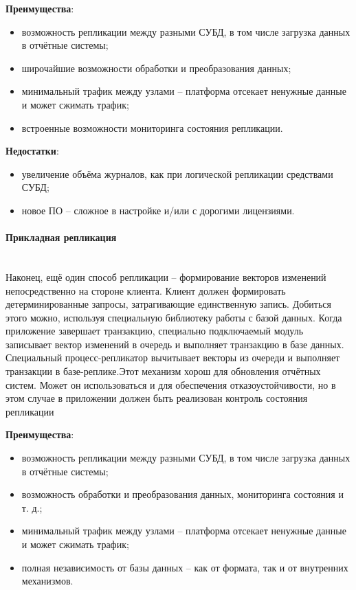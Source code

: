 \textbf{Преимущества}:
\begin{itemize}
    \item возможность репликации между разными СУБД, в том числе загрузка данных в отчётные системы;
    \item широчайшие возможности обработки и преобразования данных;
    \item минимальный трафик между узлами – платформа отсекает ненужные данные и может сжимать трафик;
    \item встроенные возможности мониторинга состояния репликации.
\end{itemize}

\textbf{Недостатки}:
\begin{itemize}
    \item увеличение объёма журналов, как при логической репликации средствами СУБД;
    \item новое ПО – сложное в настройке и/или с дорогими лицензиями.
\end{itemize}

\paragraph{Прикладная репликация} ~\\
Наконец, ещё один способ репликации – формирование векторов изменений непосредственно на стороне клиента. Клиент должен
формировать детерминированные запросы, затрагивающие единственную запись. Добиться этого можно, используя специальную
библиотеку работы с базой данных. Когда приложение завершает транзакцию, специально подключаемый модуль записывает
вектор изменений в очередь и выполняет транзакцию в базе данных. Специальный процесс-репликатор вычитывает векторы из
очереди и выполняет транзакции в базе-реплике.Этот механизм хорош для обновления отчётных систем. Может он
использоваться и для обеспечения отказоустойчивости, но в этом случае в приложении должен быть реализован контроль
состояния репликации

\textbf{Преимущества}:
\begin{itemize}
    \item возможность репликации между разными СУБД, в том числе загрузка данных в отчётные системы;
    \item возможность обработки и преобразования данных, мониторинга состояния и т. д.;
    \item минимальный трафик между узлами – платформа отсекает ненужные данные и может сжимать трафик;
    \item полная независимость от базы данных – как от формата, так и от внутренних механизмов.
\end{itemize}

